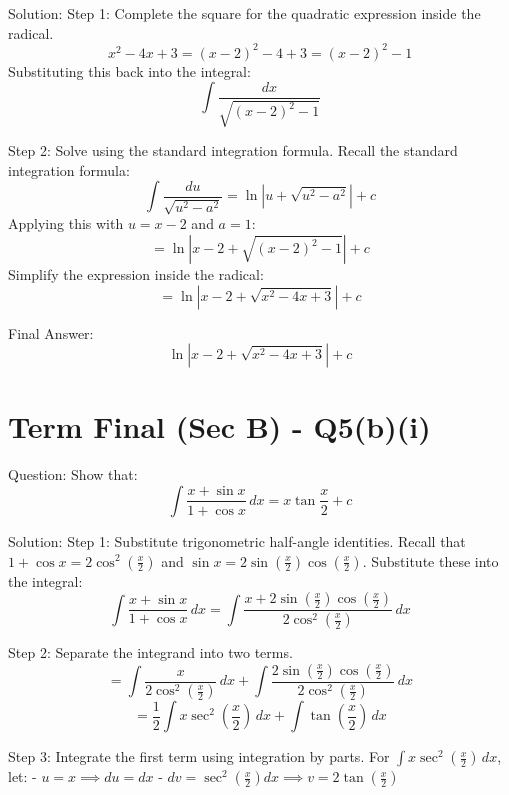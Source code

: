 \documentclass{article}
\begin{document}
Solution:
Step 1: Complete the square for the quadratic expression inside the radical.
\[
x^2 - 4x + 3 = (x-2)^2 - 4 + 3 = (x-2)^2 - 1
\]
Substituting this back into the integral:
\[
\int \frac{dx}{\sqrt{(x-2)^2 - 1}}
\]

Step 2: Solve using the standard integration formula.
Recall the standard integration formula:
\[
\int \frac{du}{\sqrt{u^2 - a^2}} = \ln\left| u + \sqrt{u^2 - a^2} \right| + c
\]
Applying this with $u = x-2$ and $a = 1$:
\[
= \ln\left| x - 2 + \sqrt{(x-2)^2 - 1} \right| + c
\]
Simplify the expression inside the radical:
\[
= \ln\left| x - 2 + \sqrt{x^2 - 4x + 3} \right| + c
\]

Final Answer:
\[
\boxed{\ln\left| x - 2 + \sqrt{x^2 - 4x + 3} \right| + c}
\]

\section*{Term Final (Sec B) - Q5(b)(i)}
Question:
Show that:
\[
\int \frac{x+\sin x}{1+\cos x} \, dx = x \tan \frac{x}{2} + c
\]

Solution:
Step 1: Substitute trigonometric half-angle identities.
Recall that $1 + \cos x = 2\cos^2\left(\frac{x}{2}\right)$ and $\sin x = 2\sin\left(\frac{x}{2}\right)\cos\left(\frac{x}{2}\right)$.
Substitute these into the integral:
\[
\int \frac{x+\sin x}{1+\cos x} \, dx = \int \frac{x + 2\sin\left(\frac{x}{2}\right)\cos\left(\frac{x}{2}\right)}{2\cos^2\left(\frac{x}{2}\right)} \, dx
\]

Step 2: Separate the integrand into two terms.
\[
= \int \frac{x}{2\cos^2\left(\frac{x}{2}\right)} \, dx + \int \frac{2\sin\left(\frac{x}{2}\right)\cos\left(\frac{x}{2}\right)}{2\cos^2\left(\frac{x}{2}\right)} \, dx
\]
\[
= \frac{1}{2} \int x \sec^2\left(\frac{x}{2}\right) \, dx + \int \tan\left(\frac{x}{2}\right) \, dx
\]

Step 3: Integrate the first term using integration by parts.
For $\int x \sec^2\left(\frac{x}{2}\right) \, dx$, let:
- $u = x \implies du = dx$
- $dv = \sec^2\left(\frac{x}{2}\right) dx \implies v = 2\tan\left(\frac{x}{2}\right)$
\end{document}
